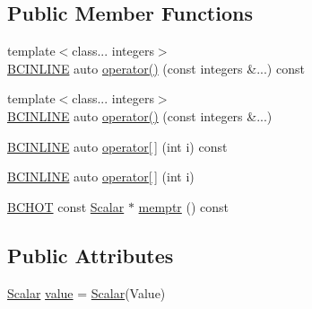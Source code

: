 \subsection*{Public Member Functions}
\begin{DoxyCompactItemize}
\item 
{\footnotesize template$<$class... integers$>$ }\\\hyperlink{BlackCat__Common_8h_a6699e8b0449da5c0fafb878e59c1d4b1}{B\+C\+I\+N\+L\+I\+NE} auto \hyperlink{structBC_1_1tensors_1_1exprs_1_1Constexpr__Scalar__Constant_3_01Value_00_01Scalar_00_01BC_1_1host__tag_01_4_aff01867a3e97a104bea02e65396b6e53}{operator()} (const integers \&...) const 
\item 
{\footnotesize template$<$class... integers$>$ }\\\hyperlink{BlackCat__Common_8h_a6699e8b0449da5c0fafb878e59c1d4b1}{B\+C\+I\+N\+L\+I\+NE} auto \hyperlink{structBC_1_1tensors_1_1exprs_1_1Constexpr__Scalar__Constant_3_01Value_00_01Scalar_00_01BC_1_1host__tag_01_4_ad4d3ce01949cb53f96ca6bce6c3d9cdb}{operator()} (const integers \&...)
\item 
\hyperlink{BlackCat__Common_8h_a6699e8b0449da5c0fafb878e59c1d4b1}{B\+C\+I\+N\+L\+I\+NE} auto \hyperlink{structBC_1_1tensors_1_1exprs_1_1Constexpr__Scalar__Constant_3_01Value_00_01Scalar_00_01BC_1_1host__tag_01_4_a8dd82daafb8c73547e5e4067e5f1771f}{operator\mbox{[}$\,$\mbox{]}} (int i) const 
\item 
\hyperlink{BlackCat__Common_8h_a6699e8b0449da5c0fafb878e59c1d4b1}{B\+C\+I\+N\+L\+I\+NE} auto \hyperlink{structBC_1_1tensors_1_1exprs_1_1Constexpr__Scalar__Constant_3_01Value_00_01Scalar_00_01BC_1_1host__tag_01_4_a72ac988a79e81b8e3d05cd2bc50133ac}{operator\mbox{[}$\,$\mbox{]}} (int i)
\item 
\hyperlink{BlackCat__Common_8h_ac085f07cc309e3aac24aa3fc0a40f6d2}{B\+C\+H\+OT} const \hyperlink{namespaceBC_1_1tensors_1_1common__using_a22de9a173f6aa6b07a3b4f543c9ad5c1}{Scalar} $\ast$ \hyperlink{structBC_1_1tensors_1_1exprs_1_1Constexpr__Scalar__Constant_3_01Value_00_01Scalar_00_01BC_1_1host__tag_01_4_a56b480976f99db700cb547ba40b704c4}{memptr} () const 
\end{DoxyCompactItemize}
\subsection*{Public Attributes}
\begin{DoxyCompactItemize}
\item 
\hyperlink{namespaceBC_1_1tensors_1_1common__using_a22de9a173f6aa6b07a3b4f543c9ad5c1}{Scalar} \hyperlink{structBC_1_1tensors_1_1exprs_1_1Constexpr__Scalar__Constant_3_01Value_00_01Scalar_00_01BC_1_1host__tag_01_4_a462b84955d06631b0ec510917c8b8cc3}{value} = \hyperlink{namespaceBC_1_1tensors_1_1common__using_a22de9a173f6aa6b07a3b4f543c9ad5c1}{Scalar}(Value)
\end{DoxyCompactItemize}

